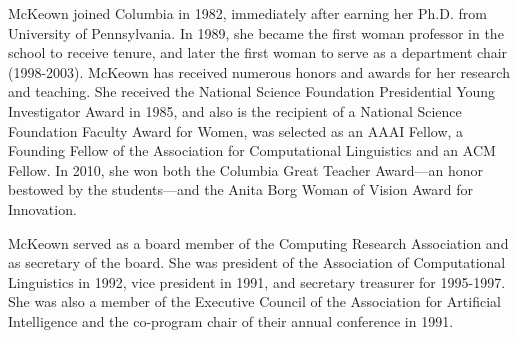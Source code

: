 McKeown joined Columbia in 1982, immediately after earning her Ph.D. from University of Pennsylvania. In 1989, she became the first woman professor in the school to receive tenure, and later the first woman to serve as a department chair (1998-2003). McKeown has received numerous honors and awards for her research and teaching. She received the National Science Foundation Presidential Young Investigator Award in 1985, and also is the recipient of a National Science Foundation Faculty Award for Women, was selected as an AAAI Fellow, a Founding Fellow of the Association for Computational Linguistics and an ACM Fellow. In 2010, she won both the Columbia Great Teacher Award—an honor bestowed by the students—and the Anita Borg Woman of Vision Award for Innovation.

McKeown served as a board member of the Computing Research Association and as secretary of the board. She was president of the Association of Computational Linguistics in 1992, vice president in 1991, and secretary treasurer for 1995-1997. She was also a member of the Executive Council of the Association for Artificial Intelligence and the co-program chair of their annual conference in 1991.

\newpage
